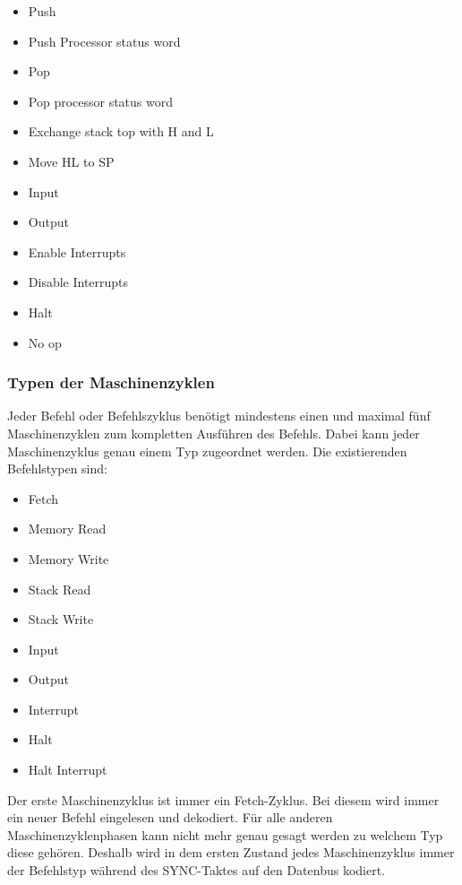 \documentclass[12pt]{article}
\begin{document}
\begin{multicols}{2}
\begin{itemize}
\item Push
\item Push Processor status word
\item Pop
\item Pop processor status word
\item Exchange stack top with H and L
\item Move HL to SP
\item Input
\item Output
\item Enable Interrupts
\item Disable Interrupts
\item Halt
\item No op
\end{itemize}
\end{multicols}


\subsubsection{Typen der Maschinenzyklen}
Jeder Befehl oder Befehlszyklus benötigt mindestens einen und maximal fünf Maschinenzyklen zum kompletten Ausführen des Befehls. Dabei kann jeder Maschinenzyklus genau einem Typ zugeordnet werden. Die existierenden Befehlstypen sind:

\begin{itemize}
\item Fetch
\item Memory Read
\item Memory Write
\item Stack Read
\item Stack Write
\item Input
\item Output
\item Interrupt
\item Halt
\item Halt Interrupt
\end{itemize}

\noindent
Der erste Maschinenzyklus ist immer ein Fetch-Zyklus. Bei diesem wird immer ein neuer Befehl eingelesen und dekodiert. Für alle anderen Maschinenzyklenphasen kann nicht mehr genau gesagt werden zu welchem Typ diese gehören. Deshalb wird in dem ersten Zustand jedes Maschinenzyklus immer der Befehlstyp während des SYNC-Taktes auf den Datenbus kodiert. \cite{IntMan18}
\end{document}
